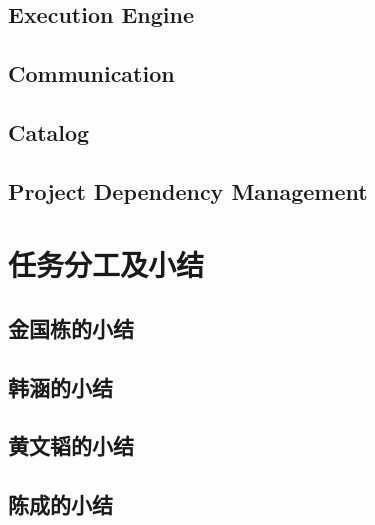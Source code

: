 \documentclass[a4paper, 12pt]{ctexart}
\begin{document}
\subsection{Execution Engine}


\subsection{Communication}


\subsection{Catalog}

\subsection{Project Dependency Management}

\section{任务分工及小结}

\subsection{金国栋的小结}

\subsection{韩涵的小结}

\subsection{黄文韬的小结}

\subsection{陈成的小结}





 
\end{document}
